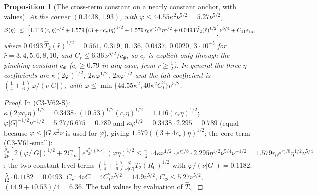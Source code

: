 \documentclass[11pt]{article}
\theoremstyle{plain}
\newtheorem{proposition}[theorem]{Proposition}
\theoremstyle{definition}
\theoremstyle{remark}
\begin{document}
\begin{proposition}[The cross-term constant on a nearly constant anchor, with values]
\label{prop:c4v18-S}
At the corner \((0.3438,1.93)\), with \(\varphi\le44.55\kappa^2\nu^{5/2}=5.27\nu^{5/2}\),
\begin{equation}
 \mathcal S(\eta)\ \le\ \Bigl[1.116\,(c_r\eta)^{1/2}+1.579\,\bigl((3+4c_r)\eta\bigr)^{1/2}+1.579\,r_0e^{r_2^2/8}\eta^{1/2}+0.0493\,\widehat T_2(\hat r)^{1/2}\Bigr]\nu^{5/4}+C_{11}\varepsilon_{\rm th},
 \label{eq:c4v18-S}
\end{equation}
where \(0.0493\,\widehat T_2(\hat r)^{1/2}=0.561,\ 0.319,\ 0.136,\ 0.0437,\ 0.0020,\ 3\cdot10^{-5}\) for
\(\hat r=3,4,5,6,8,10\); and \(C_r\le6.36\,\nu^{5/2}/c_\Phi\), so \(c_r\) is explicit only through
the pinching constant \(c_\Phi\) (\(c_r\ge0.79\) in any case, from \(r\ge\frac12\)).  In general
the three \(\eta\)-coefficients are \(\kappa(2\varphi)^{1/2}\), \(2\kappa\varphi^{1/2}\), \(2\kappa\varphi^{1/2}\) and the tail
coefficient is \((\frac14+\frac16)\varphi/(\nu|G|)\), with \(\varphi\le\min\{44.55\kappa^2,40\kappa^2C_I^2\}\nu^{5/2}\).
\end{proposition}

\begin{proof}
In (C3-V62-S): \(\kappa(2\varphi c_r\eta)^{1/2}=0.3438\cdot(10.53)^{1/2}(c_r\eta)^{1/2}=1.116(c_r\eta)^{1/2}\);
\(\varphi|G|^{-1/2}\nu^{-1/2}=5.27/6.675=0.789\) and \(\kappa\varphi^{1/2}=0.3438\cdot2.295=0.789\) (equal because
\(\varphi\le|G|\kappa^2\nu\) is used for \(\varphi\)), giving \(1.579((3+4c_r)\eta)^{1/2}\); the core term
(C3-V61-small): \(\frac{\rho_0}{2\nu}[2(\varphi/|G|)^{1/2}+2C_\infty]e^{\rho_2^2/(8\nu)}(\varphi\eta)^{1/2}\le\frac{r_0}2\cdot4\kappa\nu^{1/2}\cdot e^{r_2^2/8}\cdot2.295\eta^{1/2}\nu^{5/4}\nu^{-1/2}=1.579r_0e^{r_2^2/8}\eta^{1/2}\nu^{5/4}\);
the two constant-level terms \((\frac14+\frac16)\frac{\varphi}{\nu|G|}T_2(R_0)^{1/2}\) with \(\varphi/(\nu|G|)=0.1182\);
\(\frac5{12}\cdot0.1182=0.0493\).  \(C_r\): \(4\nu C=4C_I^2\nu^{5/2}=14.9\nu^{5/2}\), \(C_\Phi\le5.27\nu^{5/2}\),
\((14.9+10.53)/4=6.36\).  The tail values by evaluation of \(\widehat T_2\).
\end{proof}
\end{document}
